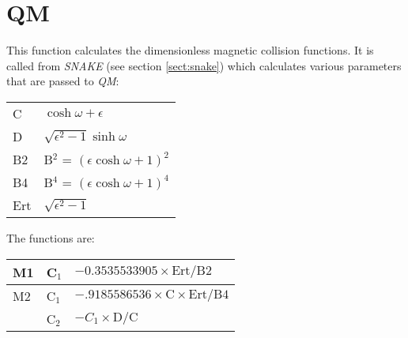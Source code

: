 \section{QM}
\label{sect:qm}

\noindent This function calculates the dimensionless magnetic
collision functions. It is called from {\em SNAKE} (see section
\ref{sect:snake}) which calculates various parameters that are passed
to {\em QM}:\\

\begin{center}
\begin{tabular}{ll}
C & $\cosh\omega + \epsilon$\\
D & $\sqrt{\epsilon^2 - 1} \sinh\omega$\\
B2 & B$^2$ = $(\epsilon \cosh\omega + 1)^2$\\
B4 & B$^4$ = $(\epsilon \cosh\omega + 1)^4$\\
Ert & $\sqrt{\epsilon^2 - 1}$\\
\end{tabular}
\end{center}

\noindent The functions are:\\

\begin{center}
\begin{tabular}{|l|l|l|}
\hline
M1 & C$_1$ & $-0.3535533905 \times \mathrm{Ert} / \mathrm{B2}$\\
\hline
M2 & C$_1$ & $-.9185586536 \times \mathrm{C} \times \mathrm{Ert}/\mathrm{B4}$\\
   & C$_2$ & $-C_1 \times \mathrm{D} / \mathrm{C}$\\
\hline
\end{tabular}
\end{center}
